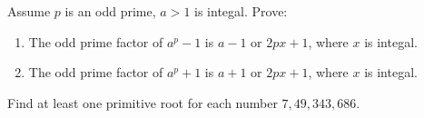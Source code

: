 \documentclass{ctexart}
\newif\ifpreface
\begin{document}
\large
\setlength{\baselineskip}{1.2em}
\ifpreface

\else
{}
\begin{problem}\label{pro:1}
  Assume \(p\) is an odd prime, \(a > 1\) is integal.
  Prove:
  \begin{enumerate}
    \item The odd prime factor of \(a^p-1\) is \(a-1\) or \(2px + 1\),
      where \(x\) is integal.
    \item The odd prime factor of \(a^p +1\) is \(a + 1\) or \(2px + 1\),
      where \(x\) is integal.
  \end{enumerate}
\end{problem}

\begin{problem}\label{pro:2}
  Find at least one primitive root for each number \(7,49,343,686\).
\end{problem}
\end{document}
